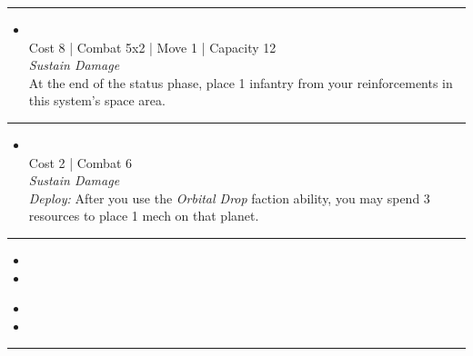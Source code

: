 \begin{multicols}{2}
\vspace{-10pt}\rule{\hsize}{0.4pt}\vspace{5pt}


\begin{itemize}
\item {}\\
Cost 8 | Combat 5x2 | Move 1 | Capacity 12 \\
\emph{Sustain Damage}\\
At the end of the status phase, place 1 infantry from your reinforcements in this system's space area.
\end{itemize}

\vspace{-10pt}\rule{\hsize}{0.4pt}\vspace{5pt}


\begin{itemize}
\item {}
\\
Cost 2 | Combat 6 \\
\emph{Sustain Damage}\\
\emph{Deploy:} After you use the \emph{Orbital Drop} faction ability, you may spend 3 resources to place 1 mech on that planet. 

\end{itemize}

\vspace{-10pt}\rule{\hsize}{0.4pt}\vspace{5pt}


\begin{itemize}
\item \advancedCarrierI
\item \opsI
\end{itemize}

\columnbreak
{}

\begin{itemize}
\item \advancedCarrierII
\item \opsII
\end{itemize}

\vspace{-10pt}\rule{\hsize}{0.4pt}\vspace{5pt}


\end{multicols}

